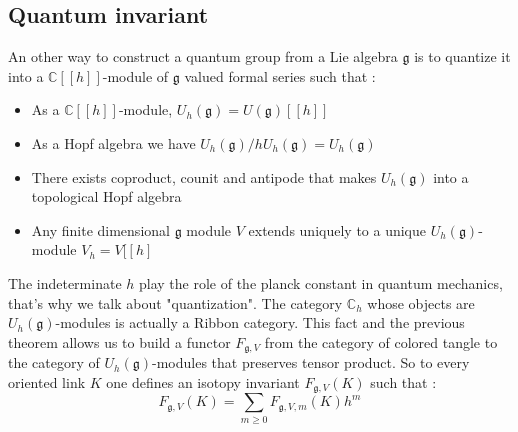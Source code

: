 \documentclass{article}
\theoremstyle{definition}
\begin{document}
\subsection{Quantum invariant}
An other way to construct a quantum group from a Lie algebra $\mathfrak{g}$ is to quantize it into a $\mathbb{C}[[h]]$-module of $\mathfrak{g}$ valued formal series such that :
\begin{itemize}
\item As a $\mathbb{C}[[h]]$-module, $U_h(\mathfrak{g})=U(\mathfrak{g})[[h]]$\\
\item As a Hopf algebra we have $U_h(\mathfrak{g})/hU_h(\mathfrak{g})=U_h(\mathfrak{g})$\\
\item There exists coproduct, counit and antipode that makes $U_h(\mathfrak{g})$ into a topological Hopf algebra\\
\item Any finite dimensional $\mathfrak{g}$ module $V$ extends uniquely to a unique $U_h(\mathfrak{g})$-module $V_h=V[[h]$
\end{itemize}
The indeterminate $h$ play the role of the planck constant in quantum mechanics, that's why we talk about "quantization". The category $\mathbb{C}_h$ whose objects are $U_h(\mathfrak{g})$-modules is actually a Ribbon category. This fact and the previous theorem allows us to build a functor $F_{\mathfrak{g},V}$ from the category of colored tangle to the category of $U_h(\mathfrak{g})$-modules that preserves tensor product. So to every oriented link $K$ one defines an isotopy invariant $F_{\mathfrak{g},V}(K)$ such that : $$F_{\mathfrak{g},V}(K)=\sum_{m\geq 0}F_{\mathfrak{g},V,m}(K)h^m$$

{}

\end{document}
